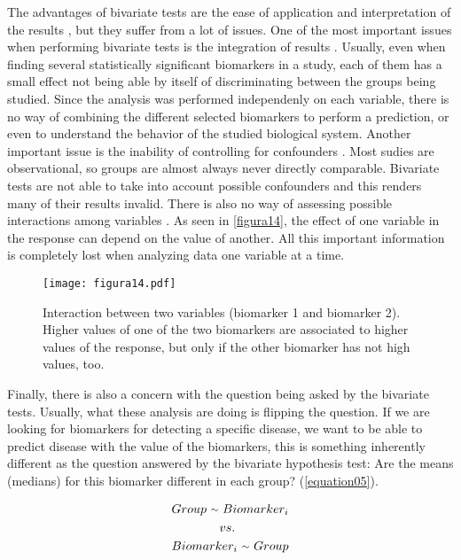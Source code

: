 The advantages of bivariate tests are the ease of application and interpretation of the results \parencite{vetter2018unadjusted}, but they suffer from a lot of issues. One of the most important issues when performing bivariate tests is the integration of results \parencite{katz2011multivariable}. Usually, even when finding several statistically significant biomarkers in a study, each of them has a small effect not being able by itself of discriminating between the groups being studied. Since the analysis was performed independenly on each variable, there is no way of combining the different selected biomarkers to perform a prediction, or even to understand the behavior of the studied biological system. Another important issue is the inability of controlling for confounders \parencite{heinze2017five}. Most sudies are observational, so groups are almost always never directly comparable. Bivariate tests are not able to take into account possible confounders and this renders many of their results invalid. There is also no way of assessing possible interactions among variables \parencite{hassall2018beyond}. As seen in \autoref{figura14}, the effect of one variable in the response can depend on the value of another. All this important information is completely lost when analyzing data one variable at a time.

\begin{figure}[hbtp]
	\centering
\texttt{[image: figura14.pdf]}
\caption[Interaction between two variables]{Interaction between two variables (biomarker 1 and biomarker 2). Higher values of one of the two biomarkers are associated to higher values of the response, but only if the other biomarker has not high values, too.}
\label{figura14}
\end{figure}

Finally, there is also a concern with the question being asked by the bivariate tests. Usually, what these analysis are doing is flipping the question. If we are looking for biomarkers for detecting a specific disease, we want to be able to predict disease with the value of the biomarkers, this is something inherently different as the question answered by the bivariate hypothesis test: Are the means (medians) for this biomarker different in each group? (\autoref{equation05}). 

\begin{equation}
\label{equation05}
\begin{split}
    Group\ {\raise.17ex\hbox{$\scriptstyle\sim$}}\ Biomarker_i \\
    vs. \phantom{MMMM}  \\
    Biomarker_i\ {\raise.17ex\hbox{$\scriptstyle\sim$}}\ Group
\end{split}
\end{equation}


